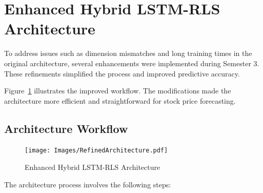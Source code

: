 \section{Enhanced Hybrid LSTM-RLS Architecture}

To address issues such as dimension mismatches and long training times in the original architecture, several enhancements were implemented during Semester 3. These refinements simplified the process and improved predictive accuracy.

Figure~\ref{fig:Refinedarch} illustrates the improved workflow. The modifications made the architecture more efficient and straightforward for stock price forecasting.

\subsection{Architecture Workflow}

\begin{figure}[htbp]
    \centering
    \texttt{[image: Images/RefinedArchitecture.pdf]} %
    \caption{Enhanced Hybrid LSTM-RLS Architecture}
    \label{fig:Refinedarch}
\end{figure}

The architecture process involves the following steps:

